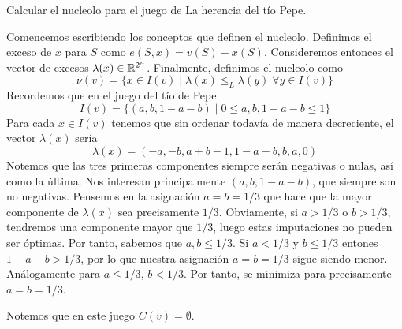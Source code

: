 \documentclass[twoside]{article}
\begin{document}
\newpage
\begin{ejercicio}{6}
Calcular el nucleolo para el juego de La herencia del tío Pepe. 
\end{ejercicio}
\begin{solucion}
Comencemos escribiendo los conceptos que definen el nucleolo. Definimos el exceso de $x$ para $S$ como $e(S,x) = v(S)-x(S)$. Consideremos entonces el vector de excesos $\lambda(x) \in \mathbb{R}^{2^n}$. Finalmente, definimos el nucleolo como
$$
\nu(v)=\{x\in I(v) \mid \lambda(x)\leq_L\lambda(y) \;\forall y \in I(v)\}
$$
Recordemos que en el juego del tío de Pepe
$$
I(v) = \{(a,b,1-a-b) \mid  0\leq a,b,1-a-b\leq 1\}
$$
Para cada $x\in I(v)$ tenemos que sin ordenar todavía de manera decreciente, el vector $\lambda(x)$ sería
$$
\lambda(x) =(-a,-b,a+b-1,1-a-b,b,a,0)
$$ 
Notemos que las tres primeras componentes siempre serán negativas o nulas, así como la última. Nos interesan principalmente $(a,b,1-a-b)$, que siempre son no negativas. Pensemos en la asignación $a=b=1/3$  que hace que la mayor componente de $\lambda(x)$ sea precisamente $1/3$. Obviamente, si $a>1/3$ o $b>1/3$, tendremos una componente mayor que $1/3$, luego estas imputaciones no pueden ser óptimas. Por tanto, sabemos que $a,b\leq 1/3$. Si $a<1/3$ y $b\leq 1/3$ entones $1-a-b> 1/3$, por lo que nuestra asignación $a=b=1/3$ sigue siendo menor. Análogamente para $a\leq 1/3$, $b<1/3$. Por tanto, se minimiza para precisamente $a=b=1/3$.

Notemos que en este juego $C(v)=\emptyset$. 
\end{solucion}
\end{document}
